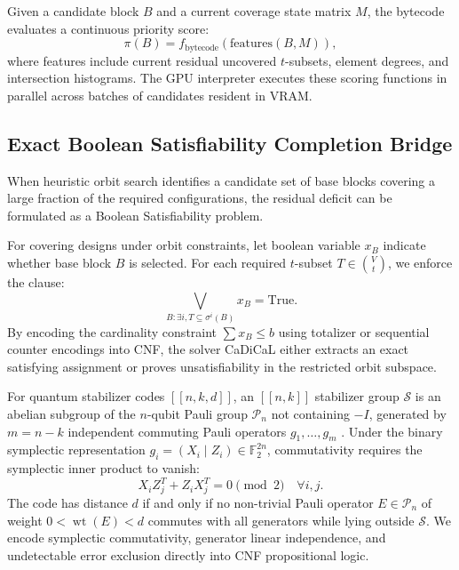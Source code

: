 \documentclass[11pt,a4paper]{article}
\begin{document}
Given a candidate block $B$ and a current coverage state matrix $M$, the bytecode evaluates a continuous priority score:
\begin{equation}
\label{eq:priority}
\pi(B) = f_{\text{bytecode}}(\text{features}(B, M)),
\end{equation}
where features include current residual uncovered $t$-subsets, element degrees, and intersection histograms. The GPU interpreter executes these scoring functions in parallel across batches of candidates resident in VRAM.

\subsection{Exact Boolean Satisfiability Completion Bridge}
\label{sec:sat}
When heuristic orbit search identifies a candidate set of base blocks covering a large fraction of the required configurations, the residual deficit can be formulated as a Boolean Satisfiability problem.

For covering designs under orbit constraints, let boolean variable $x_{B}$ indicate whether base block $B$ is selected. For each required $t$-subset $T \in \binom{V}{t}$, we enforce the clause:
\begin{equation}
\label{eq:sat_clause}
\bigvee_{B : \exists i, T \subseteq \sigma^i(B)} x_{B} = \text{True}.
\end{equation}
By encoding the cardinality constraint $\sum x_B \le b$ using totalizer or sequential counter encodings into CNF, the solver CaDiCaL \cite{biere2020cadical} either extracts an exact satisfying assignment or proves unsatisfiability in the restricted orbit subspace.

For quantum stabilizer codes $[[n, k, d]]$, an $[[n, k]]$ stabilizer group $\mathcal{S}$ is an abelian subgroup of the $n$-qubit Pauli group $\mathcal{P}_n$ not containing $-I$, generated by $m = n - k$ independent commuting Pauli operators $g_1, \dots, g_m$ \cite{gottesman1996stabilizer, calderbank1998quantum}. Under the binary symplectic representation $g_i = (X_i \mid Z_i) \in \mathbb{F}_2^{2n}$, commutativity requires the symplectic inner product to vanish:
\begin{equation}
\label{eq:symplectic}
X_i Z_j^T + Z_i X_j^T = 0 \pmod 2 \quad \forall i, j.
\end{equation}
The code has distance $d$ if and only if no non-trivial Pauli operator $E \in \mathcal{P}_n$ of weight $0 < \operatorname{wt}(E) < d$ commutes with all generators while lying outside $\mathcal{S}$. We encode symplectic commutativity, generator linear independence, and undetectable error exclusion directly into CNF propositional logic.
\end{document}
